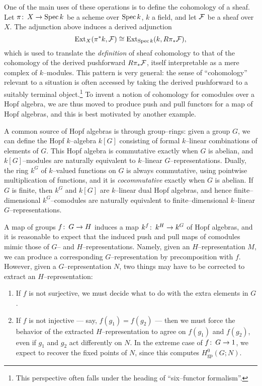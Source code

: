 One of the main uses of these operations is to define the cohomology of a sheaf.  Let $\pi\colon\thinspace X \to \operatorname{Spec} k$ be a scheme over $\operatorname{Spec} k$, $k$ a field, and let $\mathcal{F}$ be a sheaf over $X$.  The adjunction above induces a derived adjunction \[\operatorname{Ext}_X(\pi^* k, \mathcal{F}) \cong \operatorname{Ext}_{\operatorname{Spec} k}(k, R\pi_* \mathcal{F}),\] which is used to translate the \emph{definition} of sheaf cohomology to that of the cohomology of the derived pushforward $R\pi_* \mathcal{F}$, itself interpretable as a mere complex of $k$--modules.  This pattern is very general: the sense of ``cohomology'' relevant to a situation is often accessed by taking the derived pushforward to a suitably terminal object.\footnote{This perspective often falls under the heading of ``six--functor formalism''.}  To invent a notion of cohomology for comodules over a Hopf algebra, we are thus moved to produce push and pull functors for a map of Hopf algebras, and this is best motivated by another example.

\begin{example}\label{HopfAlgebrasFromFiniteGroups}
A common source of Hopf algebras is through group--rings: given a group $G$, we can define the Hopf $k$--algebra $k[G]$ consisting of formal $k$--linear combinations of elements of $G$.  This Hopf algebra is commutative exactly when $G$ is abelian, and $k[G]$--modules are naturally equivalent to $k$--linear $G$--representations.  Dually, the ring $k^G$ of $k$--valued functions on $G$ is always commutative, using pointwise multiplication of functions, and it is \emph{cocommutative} exactly when $G$ is abelian.  If $G$ is finite, then $k^G$ and $k[G]$ are $k$--linear dual Hopf algebras, and hence finite--dimensional $k^G$--comodules are naturally equivalent to finite--dimensional $k$--linear $G$--representations.

A map of groups $f\colon\thinspace G \to H$ induces a map $k^f\colon\thinspace k^H \to k^G$ of Hopf algebras, and it is reasonable to expect that the induced push and pull maps of comodules mimic those of $G$-- and $H$--representations.  Namely, given an $H$--representation $M$, we can produce a corresponding $G$--representation by precomposition with $f$.  However, given a $G$--representation $N$, two things may have to be corrected to extract an $H$--representation:
\begin{enumerate}
\item If $f$ is not surjective, we must decide what to do with the extra elements in $G$.
\item If $f$ is not injective --- say, $f(g_1) = f(g_2)$ --- then we must force the behavior of the extracted $H$--representation to agree on $f(g_1)$ and $f(g_2)$, even if $g_1$ and $g_2$ act differently on $N$.  In the extreme case of $f\colon\thinspace G \to 1$, we expect to recover the fixed points of $N$, since this computes $H^0_{\mathrm{gp}}(G; N)$.
\end{enumerate}
\end{example}

